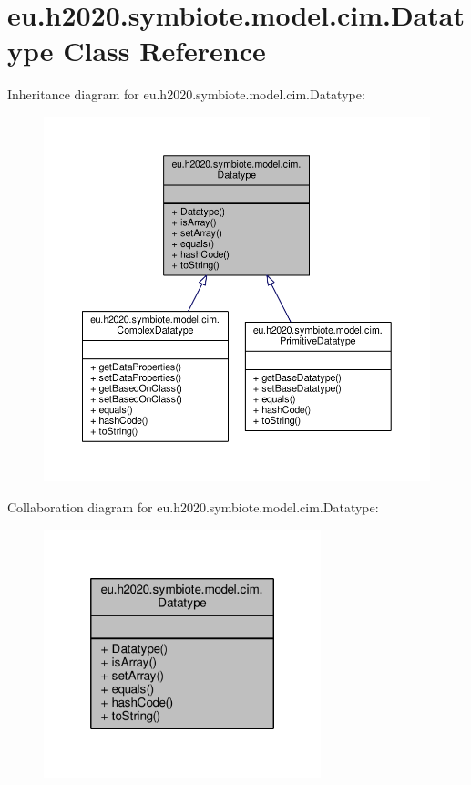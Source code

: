 \hypertarget{classeu_1_1h2020_1_1symbiote_1_1model_1_1cim_1_1Datatype}{}\section{eu.\+h2020.\+symbiote.\+model.\+cim.\+Datatype Class Reference}
\label{classeu_1_1h2020_1_1symbiote_1_1model_1_1cim_1_1Datatype}


Inheritance diagram for eu.\+h2020.\+symbiote.\+model.\+cim.\+Datatype\+:\nopagebreak
\begin{figure}[H]
\begin{center}
\leavevmode
\includegraphics[width=350pt]{classeu_1_1h2020_1_1symbiote_1_1model_1_1cim_1_1Datatype__inherit__graph}
\end{center}
\end{figure}


Collaboration diagram for eu.\+h2020.\+symbiote.\+model.\+cim.\+Datatype\+:\nopagebreak
\begin{figure}[H]
\begin{center}
\leavevmode
\includegraphics[width=228pt]{classeu_1_1h2020_1_1symbiote_1_1model_1_1cim_1_1Datatype__coll__graph}
\end{center}
\end{figure}
